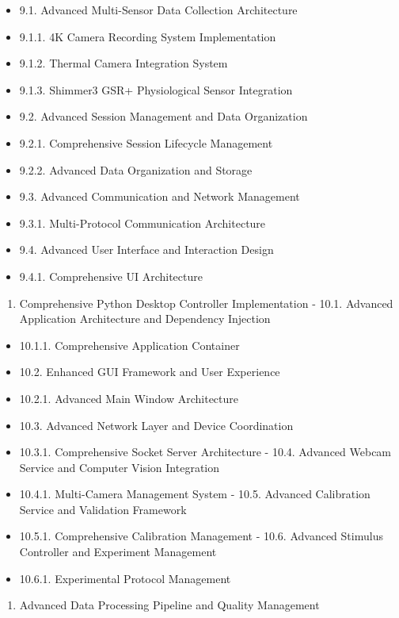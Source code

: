 \documentclass[12pt,a4paper]{report}
\begin{document}
\begin{itemize}
\item 9.1. Advanced Multi-Sensor Data Collection Architecture
\item 9.1.1. 4K Camera Recording System Implementation
\item 9.1.2. Thermal Camera Integration System
\item 9.1.3. Shimmer3 GSR+ Physiological Sensor Integration
\item 9.2. Advanced Session Management and Data Organization
\item 9.2.1. Comprehensive Session Lifecycle Management
\item 9.2.2. Advanced Data Organization and Storage
\item 9.3. Advanced Communication and Network Management
\item 9.3.1. Multi-Protocol Communication Architecture
\item 9.4. Advanced User Interface and Interaction Design
\item 9.4.1. Comprehensive UI Architecture
\end{itemize}
\begin{enumerate}
\item Comprehensive Python Desktop Controller Implementation
    -
    10.1. Advanced Application Architecture and Dependency Injection
\end{enumerate}
\begin{itemize}
\item 10.1.1. Comprehensive Application Container
\item 10.2. Enhanced GUI Framework and User Experience
\item 10.2.1. Advanced Main Window Architecture
\item 10.3. Advanced Network Layer and Device Coordination
\item 10.3.1. Comprehensive Socket Server Architecture
    -
    10.4. Advanced Webcam Service and Computer Vision Integration
\item 10.4.1. Multi-Camera Management System
    -
    10.5. Advanced Calibration Service and Validation Framework
\item 10.5.1. Comprehensive Calibration Management
    -
    10.6. Advanced Stimulus Controller and Experiment Management
\item 10.6.1. Experimental Protocol Management
\end{itemize}
\begin{enumerate}
\item Advanced Data Processing Pipeline and Quality Management
\end{enumerate}
\end{document}

